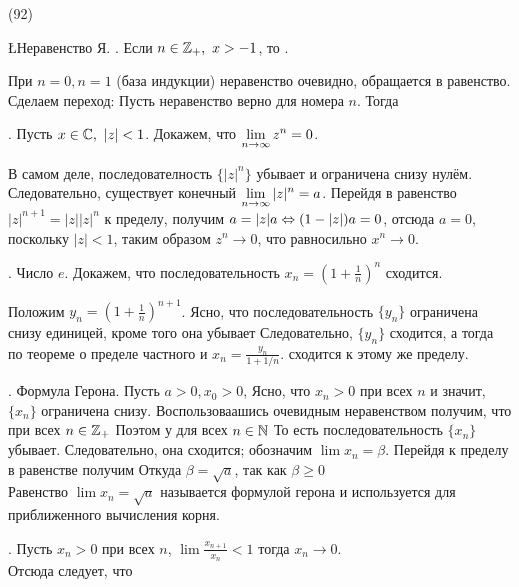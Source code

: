 (92)

\L \q Неравенство Я. . Если $n \in \mathbb{Z}_+,\ x > -1$, то .

\D При $n = 0, n = 1$ (база индукции) неравенство очевидно, обращается в равенство. Сделаем переход: Пусть неравенство верно для номера $n$. Тогда 

. Пусть $x \in \mathbb{C},\ |z| < 1$. Докажем, что $\displaystyle \lim\limits^{}_{n\to\infty} z^n = 0$.

В самом деле, последователность $\{|z|^n\}$ убывает и ограничена снизу нулём. Следовательно, существует конечный $\displaystyle \lim\limits^{}_{n\to\infty}|z|^n=a$. Перейдя в равенство $|z|^{n + 1} = |z||z|^n$ к пределу, получим $a = |z|a \Leftrightarrow (1 - |z|)a = 0$, отсюда $a = 0$, поскольку $|z| < 1$, таким образом $z^n \to 0$, что равносильно $x^n \to 0$.

. \q Число $e$. Докажем, что последовательность $x_n = (1 + \frac 1n)^n$ сходится.

Положим $y_n = (1 + \frac 1n)^{n + 1}$. Ясно, что последовательность $\{y_n\}$ ограничена снизу единицей, кроме того она убывает  Следовательно, $\{y_n\}$ сходится, а тогда по теореме о пределе частного и $x_n = \frac{y_n}{1 + 1/n}$. сходится к этому же пределу.

. \q Формула Герона. Пусть $a > 0, x_0 > 0$,  Ясно, что $x_n > 0$ при всех $n$ и значит, $\{x_n\}$ ограничена снизу. Воспользоваашись очевидным неравенством  получим, что при всех $n \in \mathbb{Z}_+$  Поэтом у для всех $n \in \mathbb{N}$ То есть последовательность $\{x_n\}$ убывает. Следовательно, она сходится; обозначим $\lim x_n =\beta$. Перейдя к пределу в равенстве получим  Откуда $\beta = \sqrt{a}$, так как $\beta \ge 0$\\
Равенство $\lim x_n = \sqrt{a}$ называется формулой герона и используется для приближенного вычисления корня.

. Пусть $x_n > 0$ при всех $n$, $\lim \frac{x_{n + 1}}{x_n} < 1$ тогда $x_n \to 0$.\\
Отсюда следует, что
